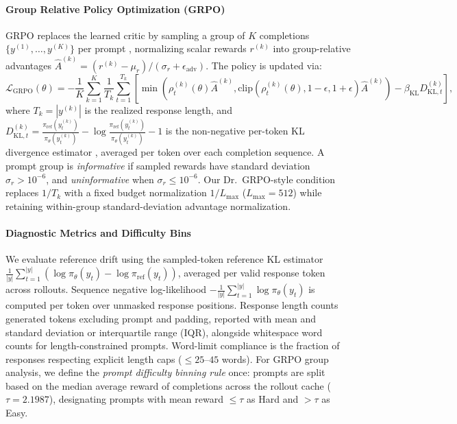\documentclass{article}
\begin{document}
\paragraph{Group Relative Policy Optimization (GRPO)} GRPO replaces the learned critic by sampling a group of $K$ completions $\{y^{(1)}, \dots, y^{(K)}\}$ per prompt \citep{shao2024deepseekmath}, normalizing scalar rewards $r^{(k)}$ into group-relative advantages $\hat{A}^{(k)} = (r^{(k)} - \mu_r) / (\sigma_r + \epsilon_{\text{adv}})$. The policy is updated via:
\[
\mathcal{L}_{\text{GRPO}}(\theta) = -\frac{1}{K}\sum_{k=1}^K \frac{1}{T_k}\sum_{t=1}^{T_k} \left[ \min\left( \rho_t^{(k)}(\theta)\hat{A}^{(k)}, \text{clip}(\rho_t^{(k)}(\theta), 1-\epsilon, 1+\epsilon)\hat{A}^{(k)} \right) - \beta_{\text{KL}} D_{\text{KL}, t}^{(k)} \right],
\]
where $T_k = |y^{(k)}|$ is the realized response length, and $D_{\text{KL}, t}^{(k)} = \frac{\pi_{\text{ref}}(y_t^{(k)})}{\pi_\theta(y_t^{(k)})} - \log \frac{\pi_{\text{ref}}(y_t^{(k)})}{\pi_\theta(y_t^{(k)})} - 1$ is the non-negative per-token KL divergence estimator \citep{shao2024deepseekmath}, averaged per token over each completion sequence. A prompt group is \textit{informative} if sampled rewards have standard deviation $\sigma_r > 10^{-6}$, and \textit{uninformative} when $\sigma_r \le 10^{-6}$. Our Dr.~GRPO-style condition \citep{liu2025understanding} replaces $1/T_k$ with a fixed budget normalization $1/L_{\max}$ ($L_{\max}=512$) while retaining within-group standard-deviation advantage normalization.

\paragraph{Diagnostic Metrics and Difficulty Bins} We evaluate reference drift using the sampled-token reference KL estimator $\frac{1}{|y|}\sum_{t=1}^{|y|} (\log \pi_\theta(y_t) - \log \pi_{\text{ref}}(y_t))$, averaged per valid response token across rollouts. Sequence negative log-likelihood $-\frac{1}{|y|}\sum_{t=1}^{|y|} \log \pi_\theta(y_t)$ is computed per token over unmasked response positions. Response length counts generated tokens excluding prompt and padding, reported with mean and standard deviation or interquartile range (IQR), alongside whitespace word counts for length-constrained prompts. Word-limit compliance is the fraction of responses respecting explicit length caps ($\le 25$--$45$ words). For GRPO group analysis, we define the \textit{prompt difficulty binning rule} once: prompts are split based on the median average reward of completions across the rollout cache ($\tau = 2.1987$), designating prompts with mean reward $\le \tau$ as Hard and $> \tau$ as Easy.
\end{document}
